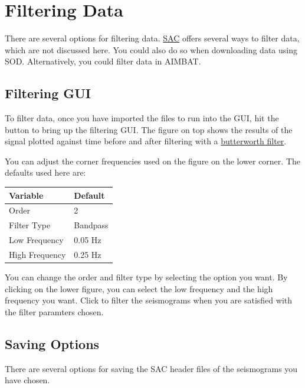 \documentclass[letterpaper,10pt,english]{sphinxmanual}
\begin{document}
\chapter{Filtering Data}
\label{docfiles/filteringData::doc}\label{docfiles/filteringData:filtering-data}
There are several options for filtering data. \href{http://www.iris.edu/files/sac-manual/}{SAC} offers several ways to filter data, which are not discussed here. You could also do so when downloading data using SOD. Alternatively, you could filter data in AIMBAT.


\section{Filtering GUI}
\label{docfiles/filteringData:filtering-gui}
To filter data, once you have imported the files to run into the GUI, hit the  button to bring up the filtering GUI. The figure on top shows the results of the signal plotted against time before and after filtering with a \href{http://en.wikipedia.org/wiki/Butterworth\_filter}{butterworth filter}.

You can adjust the corner frequencies used on the figure on the lower corner. The defaults used here are:

\begin{tabulary}{\linewidth}{|L|L|}
\hline
\textsf{\relax 
Variable
} & \textsf{\relax 
Default
}\\
\hline
Order
 & 
2
\\

Filter Type
 & 
Bandpass
\\

Low Frequency
 & 
0.05 Hz
\\

High Frequency
 & 
0.25 Hz
\\
\hline\end{tabulary}


You can change the order and filter type by selecting the option you want. By clicking on the lower figure, you can select the low frequency and the high frequency you want. Click  to filter the seismograms when you are satisfied with the filter paramters chosen.


\section{Saving Options}
\label{docfiles/filteringData:saving-options}
There are several options for saving the SAC header files of the seismograms you have chosen.
\end{document}
